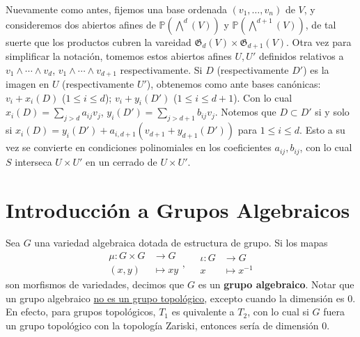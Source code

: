 \documentclass[spanish,10pt]{amsart}
\theoremstyle{definition}
\theoremstyle{remark}
\numberwithin{equation}{section}
\begin{document}
Nuevamente como antes, fijemos una base ordenada $(v_1, \ldots, v_n)$ de $V$, y consideremos dos abiertos afines de $\mathbb{P} (\bigwedge^d (V))$ y $\mathbb{P} (\bigwedge^{d+1} (V))$, de tal suerte que los productos cubren la vareidad $\mathfrak G _d (V) \times \mathfrak G _{d+1} (V)$. Otra vez para simplificar la notación, tomemos estos abiertos afines $U, U'$ definidos relativos a $v_1 \wedge \cdots \wedge v_d$, $v_1 \wedge \cdots \wedge v_{d+1}$ respectivamente. Si $D$ (respectivamente $D'$) es la imagen en $U$ (respectivamente $U'$), obtenemos como ante bases canónicas: $v_i + x_i (D)$ ($1 \leq i \leq d$); $v_i + y_i (D')$ ($1\leq i \leq d+ 1$). Con lo cual $x_i (D) = \sum_{j > d} a_{ij} v_j$, $y_i (D') = \sum_{j > d+1} b_{ij} v_j$. Notemos que $D \subset D'$ si y solo si $x_i (D) = y_i (D') + a_{i, d+1} (v_{d+1} + y_{d+1} (D'))$ para $1 \leq i \leq d$. Esto a su vez se convierte en condiciones polinomiales en los coeficientes $a_{ij}, b_{ij}$, con lo cual $S$ interseca $U \times U'$ en un cerrado de $U \times U'$.





















\section{Introducción a Grupos Algebraicos}

Sea $G$ una variedad algebraica dotada de estructura de grupo. Si los mapas
\[
    \begin{array}{ll}
    \mu : G \times G &\longrightarrow G \\
    (x,y) &\longmapsto xy
    \end{array}, \quad
    \begin{array}{ll}
    \iota : G &\longrightarrow G \\
    x &\longmapsto x^{-1}
    \end{array}
\]
son morfismos de variedades, decimos que $G$ es un \textbf{grupo algebraico}. Notar que un grupo algebraico \underline{no es un grupo topológico}, excepto cuando la dimensión es $0$. En efecto, para grupos topológicos, $T_1$ es quivalente a $T_2$, con lo cual si $G$ fuera un grupo topológico con la topología Zariski, entonces sería de dimensión $0$.
\end{document}
